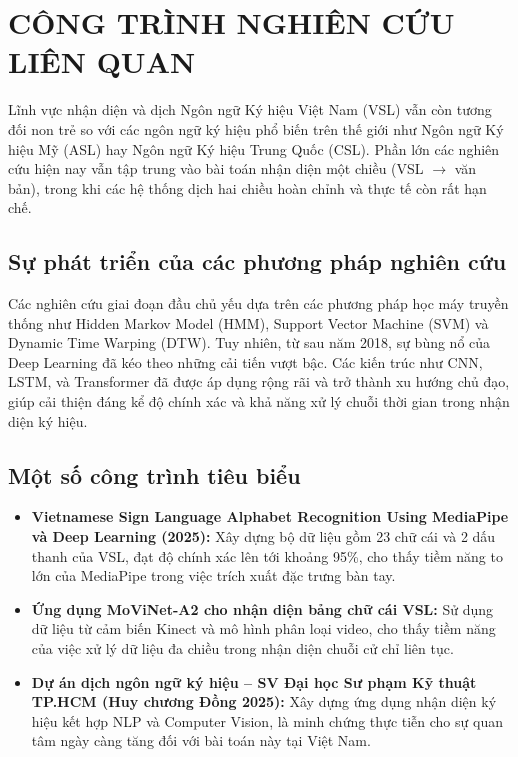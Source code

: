 
\chapter{CÔNG TRÌNH NGHIÊN CỨU LIÊN QUAN}
 
Lĩnh vực nhận diện và dịch Ngôn ngữ Ký hiệu Việt Nam (VSL) vẫn còn tương đối non trẻ so với các ngôn ngữ ký hiệu phổ biến trên thế giới như Ngôn ngữ Ký hiệu Mỹ (ASL) hay Ngôn ngữ Ký hiệu Trung Quốc (CSL). Phần lớn các nghiên cứu hiện nay vẫn tập trung vào bài toán nhận diện một chiều (VSL $\rightarrow$ văn bản), trong khi các hệ thống dịch hai chiều hoàn chỉnh và thực tế còn rất hạn chế.
 
\section{Sự phát triển của các phương pháp nghiên cứu}
 
Các nghiên cứu giai đoạn đầu chủ yếu dựa trên các phương pháp học máy truyền thống như Hidden Markov Model (HMM), Support Vector Machine (SVM) và Dynamic Time Warping (DTW). Tuy nhiên, từ sau năm 2018, sự bùng nổ của Deep Learning đã kéo theo những cải tiến vượt bậc. Các kiến trúc như CNN, LSTM, và Transformer đã được áp dụng rộng rãi và trở thành xu hướng chủ đạo, giúp cải thiện đáng kể độ chính xác và khả năng xử lý chuỗi thời gian trong nhận diện ký hiệu.
 
\section{Một số công trình tiêu biểu}
 
\begin{itemize}
    \item \textbf{Vietnamese Sign Language Alphabet Recognition Using MediaPipe và Deep Learning (2025):} Xây dựng bộ dữ liệu gồm 23 chữ cái và 2 dấu thanh của VSL, đạt độ chính xác lên tới khoảng 95\%, cho thấy tiềm năng to lớn của MediaPipe trong việc trích xuất đặc trưng bàn tay.
 
    \item \textbf{Ứng dụng MoViNet-A2 cho nhận diện bảng chữ cái VSL:} Sử dụng dữ liệu từ cảm biến Kinect và mô hình phân loại video, cho thấy tiềm năng của việc xử lý dữ liệu đa chiều trong nhận diện chuỗi cử chỉ liên tục.
 
    \item \textbf{Dự án dịch ngôn ngữ ký hiệu -- SV Đại học Sư phạm Kỹ thuật TP.HCM (Huy chương Đồng 2025):} Xây dựng ứng dụng nhận diện ký hiệu kết hợp NLP và Computer Vision, là minh chứng thực tiễn cho sự quan tâm ngày càng tăng đối với bài toán này tại Việt Nam.
\end{itemize}
 
